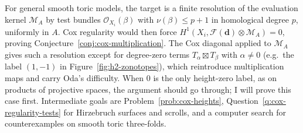 \documentclass[11pt,reqno]{amsart}
\newtheorem{question}[lemma]{Question}
\theoremstyle{remark}
\newcommand{\Ext}{\operatorname{Ext}}
\newcommand{\Cox}{\operatorname{Cox}}
\newcommand{\dd}{\mathbf{d}}
\newcommand{\zero}{\mathbf{0}}
\newcommand{\PP}{\mathbb{P}}
\newcommand{\cE}{\mathcal{E}}
\newcommand{\cF}{\mathcal{F}}
\newcommand{\cH}{\mathcal{H}}
\newcommand{\cM}{\mathcal{M}}
\newcommand{\cO}{\mathcal{O}}
\begin{document}
For general smooth toric models, the target is a finite resolution of the evaluation kernel $\cM_A$ by test bundles $\cO_{X_i}(\beta)$ with $\nu(\beta)\le p+1$ in homological degree $p$, uniformly in $A$. Cox regularity would then force $H^1(X_i,\cF(\dd)\otimes\cM_A)=0$, proving Conjecture~\ref{conj:cox-multiplication}. The Cox diagonal applied to $\cM_A$ gives such a resolution except for degree-zero terms $T_\alpha\boxtimes T_\beta$ with $\alpha\ne0$ (e.g.\ the label $(1,-1)$ in Figure~\ref{fig:h2-zonotopes}), which reintroduce multiplication maps and carry Oda's difficulty. When $0$ is the only height-zero label, as on products of projective spaces, the argument should go through; I will prove this case first. Intermediate goals are Problem~\ref{prob:cox-heights}, Question~\ref{q:cox-regularity-tests} for Hirzebruch surfaces and scrolls, and a computer search for counterexamples on smooth toric three-folds. 
%
%
\end{document}
